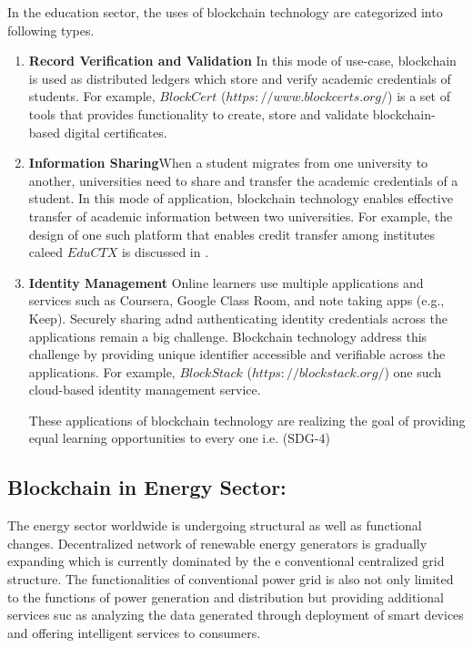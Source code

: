\documentclass[10pt]{IETBook}
\begin{document}
In the education sector, the uses of blockchain technology are categorized into following types.
\begin{enumerate}
    \item {\bf Record Verification and Validation} In this mode of use-case, blockchain is used as  distributed ledgers which  store and verify 
    academic credentials of students. For example, $BlockCert$ ($https://www.blockcerts.org/$) is a set of tools that provides functionality to create, store and validate blockchain-based digital certificates. 
    \item {\bf Information Sharing}When a student migrates from one university to another, universities need to share and transfer the academic credentials of a student. In this mode of application, blockchain technology enables effective transfer of academic information between two universities.  For example, the design of one such platform that enables credit transfer among institutes caleed $EduCTX$ is discussed in \cite{turkanovic2018eductx}.
    \item {\bf Identity Management} Online learners use multiple applications and services such as Coursera, Google Class Room, and  note taking apps (e.g., Keep). Securely sharing adnd authenticating identity credentials across the applications  remain a big challenge. Blockchain technology address this challenge by providing unique identifier accessible and verifiable across the applications. For example, $BlockStack$ ($https://blockstack.org/$) one such cloud-based identity management service.
    
    
These applications of blockchain technology are  realizing the goal of providing equal learning opportunities to every one i.e. (SDG-4)
\end{enumerate}



\subsection{Blockchain in Energy Sector:}
The energy sector worldwide is undergoing structural as well as functional changes. Decentralized network of renewable energy generators is gradually expanding which is currently dominated by the e conventional centralized grid structure. The functionalities of conventional power grid is also not only limited to the functions of  power generation and distribution but providing additional services suc as analyzing the data generated through deployment of smart devices and offering intelligent services to consumers.
\end{document}
